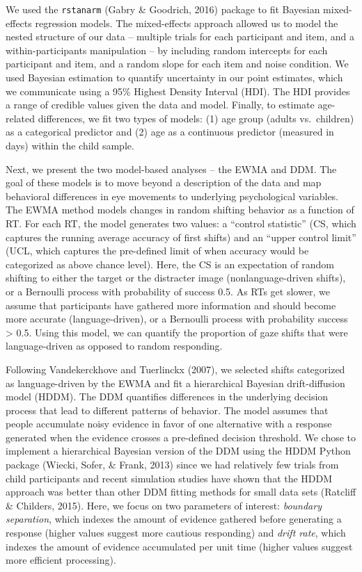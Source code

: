 \documentclass[english,floatsintext,man]{apa6}
\begin{document}
We used the \texttt{rstanarm} (Gabry \& Goodrich, 2016) package to fit
Bayesian mixed-effects regression models. The mixed-effects approach
allowed us to model the nested structure of our data -- multiple trials
for each participant and item, and a within-participants manipulation --
by including random intercepts for each participant and item, and a
random slope for each item and noise condition. We used Bayesian
estimation to quantify uncertainty in our point estimates, which we
communicate using a 95\% Highest Density Interval (HDI). The HDI
provides a range of credible values given the data and model. Finally,
to estimate age-related differences, we fit two types of models: (1) age
group (adults vs.~children) as a categorical predictor and (2) age as a
continuous predictor (measured in days) within the child sample.

Next, we present the two model-based analyses -- the EWMA and DDM. The
goal of these models is to move beyond a description of the data and map
behavioral differences in eye movements to underlying psychological
variables. The EWMA method models changes in random shifting behavior as
a function of RT. For each RT, the model generates two values: a
\enquote{control statistic} (CS, which captures the running average
accuracy of first shifts) and an \enquote{upper control limit} (UCL,
which captures the pre-defined limit of when accuracy would be
categorized as above chance level). Here, the CS is an expectation of
random shifting to either the target or the distracter image
(nonlanguage-driven shifts), or a Bernoulli process with probability of
success 0.5. As RTs get slower, we assume that participants have
gathered more information and should become more accurate
(language-driven), or a Bernoulli process with probability success
\textgreater{} 0.5. Using this model, we can quantify the proportion of
gaze shifts that were language-driven as opposed to random responding.

Following Vandekerckhove and Tuerlinckx (2007), we selected shifts
categorized as language-driven by the EWMA and fit a hierarchical
Bayesian drift-diffusion model (HDDM). The DDM quantifies differences in
the underlying decision process that lead to different patterns of
behavior. The model assumes that people accumulate noisy evidence in
favor of one alternative with a response generated when the evidence
crosses a pre-defined decision threshold. We chose to implement a
hierarchical Bayesian version of the DDM using the HDDM Python package
(Wiecki, Sofer, \& Frank, 2013) since we had relatively few trials from
child participants and recent simulation studies have shown that the
HDDM approach was better than other DDM fitting methods for small data
sets (Ratcliff \& Childers, 2015). Here, we focus on two parameters of
interest: \emph{boundary separation}, which indexes the amount of
evidence gathered before generating a response (higher values suggest
more cautious responding) and \emph{drift rate}, which indexes the
amount of evidence accumulated per unit time (higher values suggest more
efficient processing).
\end{document}

